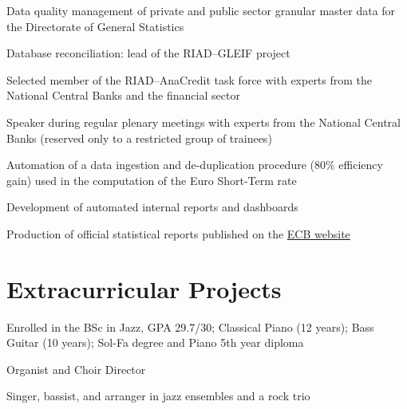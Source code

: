 \documentclass[]{deedy-resume-reversed}
\begin{document}
\begin{minipage}[t]{0.60\textwidth}
\begin{tightemize}
\item Data quality management of private and public sector granular master data for the Directorate of General Statistics
\item Database reconciliation: lead of the RIAD–GLEIF project
\item Selected member of the RIAD–AnaCredit task force with experts from the National Central Banks and the financial sector
\item Speaker during regular plenary meetings with experts from the National Central Banks (reserved only to a restricted group of trainees)
\item Automation of a data ingestion and de-duplication procedure (80\% efficiency gain) used in the computation of the Euro Short-Term rate
\item Development of automated internal reports and dashboards
\item Production of official statistical reports published on the \href{https://www.ecb.europa.eu/stats/financial_corporations/list_of_financial_institutions/html/index.en.html}{ECB website}
\end{tightemize}
\sectionsep


\section{Extracurricular Projects}
\vspace{\topsep}
\begin{tightemize}
\item Enrolled in the BSc in Jazz, GPA 29.7/30; Classical Piano (12 years); Bass Guitar (10 years); Sol-Fa degree and Piano 5th year diploma
\item Organist and Choir Director
\item Singer, bassist, and arranger in jazz ensembles and a rock trio
\end{tightemize}
\sectionsep





\end{minipage}
\end{document}
